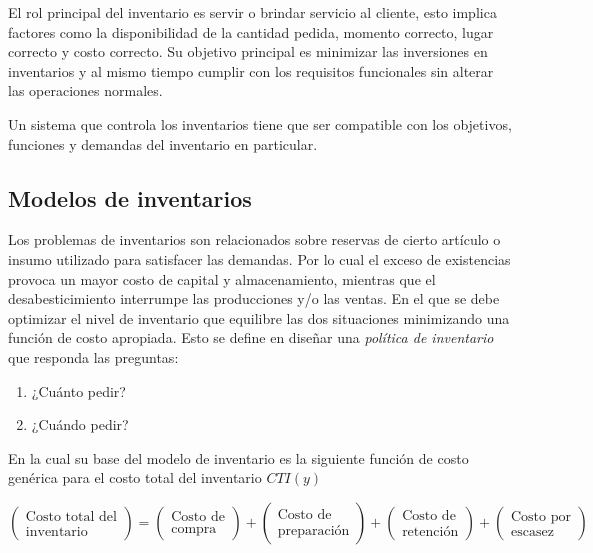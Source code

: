 El rol principal del inventario es servir o brindar servicio al cliente, esto implica factores como la disponibilidad de la cantidad pedida, momento correcto, lugar correcto y costo correcto. Su objetivo principal es minimizar las inversiones en inventarios y al mismo tiempo cumplir con los requisitos funcionales sin alterar las operaciones normales.

Un sistema que controla los inventarios tiene que ser compatible con los objetivos, funciones y demandas del inventario en particular.

\subsection{Modelos de inventarios}


Los problemas de inventarios son relacionados sobre reservas de cierto artículo o insumo utilizado para satisfacer las demandas. Por lo cual el exceso de existencias provoca un mayor costo de capital y almacenamiento, mientras que el desabesticimiento interrumpe las producciones y/o las ventas. En el que se debe optimizar el nivel de inventario que equilibre las dos situaciones minimizando una función de costo apropiada. Esto se define en diseñar una \textsl{política de inventario} \citep{taha2012investigacion} que responda las preguntas:

\begin{enumerate}
	\item ¿Cuánto pedir?
	\item ¿Cuándo pedir?
\end{enumerate}

En la cual su base del modelo de inventario es la siguiente función de costo genérica para el costo total del inventario $CTI(y)$

$$
\begin{pmatrix}
\text{Costo total del} \\ 
\text{inventario}
\end{pmatrix}
=
\begin{pmatrix}
\text{Costo de} \\ 
\text{compra}
\end{pmatrix}
+
\begin{pmatrix}
\text{Costo de} \\ 
\text{preparación}
\end{pmatrix}
+
\begin{pmatrix}
\text{Costo de} \\ 
\text{retención}
\end{pmatrix}
+
\begin{pmatrix}
\text{Costo por} \\ 
\text{escasez}
\end{pmatrix}
$$

